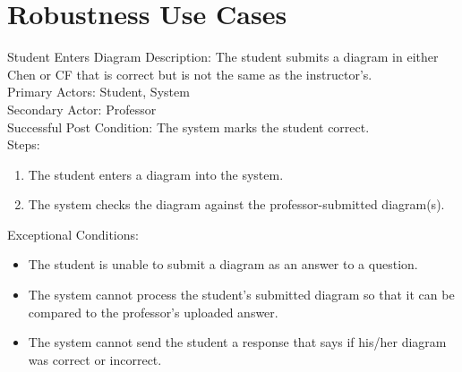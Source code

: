 \chapter{Robustness Use Cases}
    \begin{section}{Student Enters Diagram}
        Description: The student submits a diagram in either Chen or CF that is correct but is not the same as the instructor's.\\
        Primary Actors: Student, System\\
        Secondary Actor: Professor\\
        Successful Post Condition: The system marks the student correct.\\
        Steps:
        \begin{enumerate}
            \item The student enters a diagram into the system.
            \item The system checks the diagram against the professor-submitted diagram(s).
        \end{enumerate}
        Exceptional Conditions:
        \begin{itemize}
            \item The student is unable to submit a diagram as an answer to a question.
            \item The system cannot process the student's submitted diagram so that it can be compared to the professor's uploaded answer.
            \item The system cannot send the student a response that says if his/her diagram was correct or incorrect.
        \end{itemize}
    \end{section}
    
